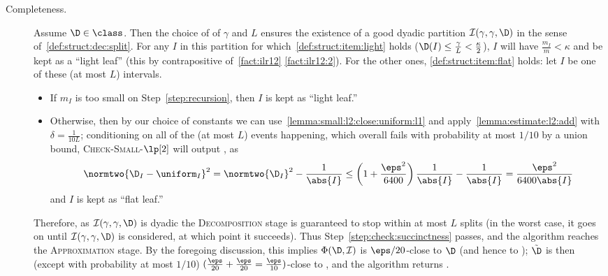 \begin{description}
  \item[Completeness.] Assume $\D\in\class$. Then the choice of of $\gamma$ and $L$ ensures the existence of a good dyadic partition $\mathcal{I}(\gamma,\gamma,\D)$ in the sense of~\cref{def:struct:dec:split}. For any $I$ in this partition for which~\ref{def:struct:item:light} holds ($\D(I) \leq \frac{\gamma}{L} < \frac{\kappa}{2}$), $I$ will have $\frac{m_I}{m} < \kappa$ and be kept as a ``light leaf'' (this by contrapositive of~\cref{fact:ilr12} \ref{fact:ilr12:2}). For the other ones, \ref{def:struct:item:flat} holds: let $I$ be one of these (at most $L$) intervals.
    \begin{itemize}
      \item If $m_I$ is too small on  Step~\ref{step:recursion}, then $I$ is kept as ``light leaf.''
      \item Otherwise, then by our choice of constants we can use~\cref{lemma:small:l2:close:uniform:l1} and apply~\cref{lemma:estimate:l2:add} with $\delta=\frac{1}{10L}$; conditioning on all of the (at most $L$) events happening, which overall fails with probability at most $1/10$ by a union bound, \textsc{Check-Small-$\lp[2]$} will output \yes, as
        \[
            \normtwo{\D_I-\uniform_I}^2 = \normtwo{\D_I}^2 - \frac{1}{\abs{I}} \leq \left( 1+\frac{\eps^2}{6400} \right) \frac{1}{\abs{I}} - \frac{1}{\abs{I}}
             = \frac{\eps^2}{6400\abs{I}}
        \]
        and $I$ is kept as ``flat leaf.''
    \end{itemize}
  Therefore, as $\mathcal{I}(\gamma,\gamma,\D)$ is dyadic the \textsc{Decomposition} stage is guaranteed to stop within at most $L$ splits (in the worst case, it goes on until $\mathcal{I}(\gamma,\gamma,\D)$ is considered, at which point it succeeds).\footnotemark{} Thus Step~\ref{step:check:succinctness} passes, and the algorithm reaches the \textsc{Approximation} stage. By the foregoing discussion, this implies $\Phi(\D,\mathcal{I})$ is $\eps/20$-close to $\D$ (and hence to \class); $\tilde{\D}$ is then (except with probability at most $1/10$) $(\frac{\eps}{20}+\frac{\eps}{20}=\frac{\eps}{10})$-close to \class, and the algorithm returns \accept.
\end{description}
 
